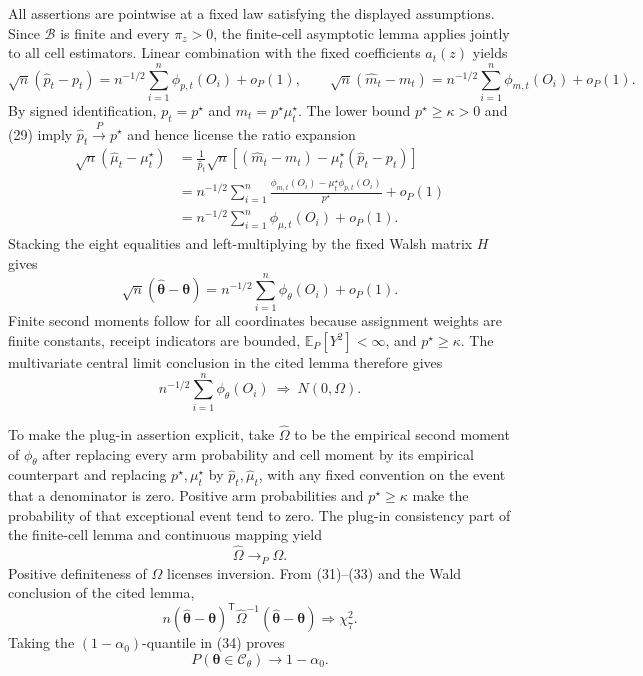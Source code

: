 All assertions are pointwise at a fixed law satisfying the displayed assumptions.  Since \(\mathcal B\) is finite and every \(\pi_z>0\), the finite-cell asymptotic lemma applies jointly to all cell estimators.  Linear combination with the fixed coefficients \(a_t(z)\) yields
\[
\sqrt n(\widehat p_t-p_t)
=n^{-1/2}\sum_{i=1}^n\phi_{p,t}(O_i)+o_P(1),
\qquad
\sqrt n(\widehat m_t-m_t)
=n^{-1/2}\sum_{i=1}^n\phi_{m,t}(O_i)+o_P(1). \tag{29}
\]
By signed identification, \(p_t=p^\star\) and \(m_t=p^\star\mu_t^\star\).  The lower bound \(p^\star\ge\kappa>0\) and (29) imply \(\widehat p_t\xrightarrow{P}p^\star\) and hence license the ratio expansion
\[
\begin{aligned}
\sqrt n(\widehat\mu_t-\mu_t^\star)
&=\frac{1}{\widehat p_t}\sqrt n
 \left[(\widehat m_t-m_t)-\mu_t^\star(\widehat p_t-p_t)\right]\\
&=n^{-1/2}\sum_{i=1}^n
 \frac{\phi_{m,t}(O_i)-\mu_t^\star\phi_{p,t}(O_i)}{p^\star}
 +o_P(1)\\
&=n^{-1/2}\sum_{i=1}^n\phi_{\mu,t}(O_i)+o_P(1).
\end{aligned} \tag{30}
\]
Stacking the eight equalities and left-multiplying by the fixed Walsh matrix \(H\) gives
\[
\sqrt n(\widehat{\boldsymbol\theta}-\boldsymbol\theta)
=n^{-1/2}\sum_{i=1}^n\phi_\theta(O_i)+o_P(1). \tag{31}
\]
Finite second moments follow for all coordinates because assignment weights are finite constants, receipt indicators are bounded, \(\mathbb E_P[Y^2]<\infty\), and \(p^\star\ge\kappa\).  The multivariate central limit conclusion in the cited lemma therefore gives
\[
n^{-1/2}\sum_{i=1}^n\phi_\theta(O_i)\ \Rightarrow\ N(0,\Omega). \tag{32}
\]

To make the plug-in assertion explicit, take \(\widehat\Omega\) to be the empirical second moment of \(\phi_\theta\) after replacing every arm probability and cell moment by its empirical counterpart and replacing \(p^\star,\mu_t^\star\) by \(\widehat p_t,\widehat\mu_t\), with any fixed convention on the event that a denominator is zero.  Positive arm probabilities and \(p^\star\ge\kappa\) make the probability of that exceptional event tend to zero.  The plug-in consistency part of the finite-cell lemma and continuous mapping yield
\[
\widehat\Omega\to_P\Omega. \tag{33}
\]
Positive definiteness of \(\Omega\) licenses inversion.  From (31)--(33) and the Wald conclusion of the cited lemma,
\[
n(\widehat{\boldsymbol\theta}-\boldsymbol\theta)^{\mathsf T}
\widehat\Omega^{-1}
(\widehat{\boldsymbol\theta}-\boldsymbol\theta)
\Rightarrow\chi_7^2. \tag{34}
\]
Taking the \((1-\alpha_0)\)-quantile in (34) proves
\[
P(\boldsymbol\theta\in\mathcal C_\theta)\longrightarrow1-\alpha_0.
\]

